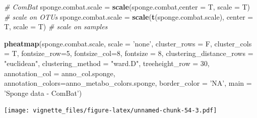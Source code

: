 \documentclass[]{book}
\newenvironment{Shaded}{\begin{snugshade}}{\end{snugshade}}
\newcommand{\KeywordTok}[1]{\textcolor[rgb]{0.13,0.29,0.53}{\textbf{#1}}}
\newcommand{\DataTypeTok}[1]{\textcolor[rgb]{0.13,0.29,0.53}{#1}}
\newcommand{\DecValTok}[1]{\textcolor[rgb]{0.00,0.00,0.81}{#1}}
\newcommand{\StringTok}[1]{\textcolor[rgb]{0.31,0.60,0.02}{#1}}
\newcommand{\CommentTok}[1]{\textcolor[rgb]{0.56,0.35,0.01}{\textit{#1}}}
\newcommand{\NormalTok}[1]{#1}
\begin{document}
\begin{Shaded}
\begin{Highlighting}[]
\CommentTok{# ComBat }
\NormalTok{sponge.combat.scale =}\StringTok{ }\KeywordTok{scale}\NormalTok{(sponge.combat,}\DataTypeTok{center =}\NormalTok{ T, }\DataTypeTok{scale =}\NormalTok{ T) }\CommentTok{# scale on OTUs}
\NormalTok{sponge.combat.scale =}\StringTok{ }\KeywordTok{scale}\NormalTok{(}\KeywordTok{t}\NormalTok{(sponge.combat.scale), }\DataTypeTok{center =}\NormalTok{ T, }\DataTypeTok{scale =}\NormalTok{ T) }\CommentTok{# scale on samples}

\KeywordTok{pheatmap}\NormalTok{(sponge.combat.scale, }
         \DataTypeTok{scale =} \StringTok{'none'}\NormalTok{, }
         \DataTypeTok{cluster_rows =}\NormalTok{ F, }
         \DataTypeTok{cluster_cols =}\NormalTok{ T, }
         \DataTypeTok{fontsize_row=}\DecValTok{5}\NormalTok{, }\DataTypeTok{fontsize_col=}\DecValTok{8}\NormalTok{,}
         \DataTypeTok{fontsize =} \DecValTok{8}\NormalTok{,}
         \DataTypeTok{clustering_distance_rows =} \StringTok{"euclidean"}\NormalTok{,}
         \DataTypeTok{clustering_method =} \StringTok{"ward.D"}\NormalTok{,}
         \DataTypeTok{treeheight_row =} \DecValTok{30}\NormalTok{,}
         \DataTypeTok{annotation_col =}\NormalTok{ anno_col.sponge,}
         \DataTypeTok{annotation_colors=}\NormalTok{anno_metabo_colors.sponge,}
         \DataTypeTok{border_color =} \StringTok{'NA'}\NormalTok{,}
         \DataTypeTok{main =} \StringTok{'Sponge data - ComBat'}\NormalTok{)}
\end{Highlighting}
\end{Shaded}

\texttt{[image: vignette\_files/figure-latex/unnamed-chunk-54-3.pdf]}
\end{document}
